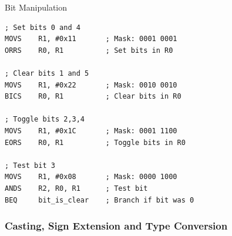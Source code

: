 \begin{example2}{Bit Manipulation}
\begin{lstlisting}[language=armasm, style=basesmol]
; Set bits 0 and 4
MOVS    R1, #0x11       ; Mask: 0001 0001
ORRS    R0, R1          ; Set bits in R0

; Clear bits 1 and 5
MOVS    R1, #0x22       ; Mask: 0010 0010
BICS    R0, R1          ; Clear bits in R0

; Toggle bits 2,3,4
MOVS    R1, #0x1C       ; Mask: 0001 1100
EORS    R0, R1          ; Toggle bits in R0

; Test bit 3
MOVS    R1, #0x08       ; Mask: 0000 1000
ANDS    R2, R0, R1      ; Test bit
BEQ     bit_is_clear    ; Branch if bit was 0
\end{lstlisting}
\end{example2}





\subsubsection{Casting, Sign Extension and Type Conversion}

